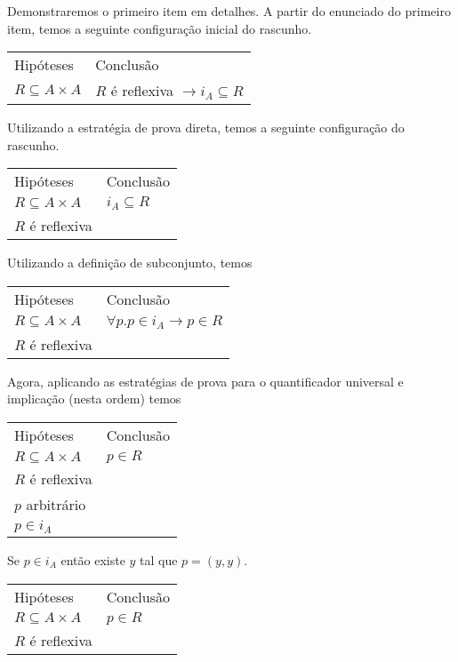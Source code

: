 \begin{Example}
Demonstraremos o primeiro item em detalhes.
A partir do enunciado do primeiro item, temos a seguinte configuração
inicial do rascunho.
\begin{flushleft}
\begin{tabular}{ll}
Hipóteses & Conclusão \\
$R\subseteq A \times A$ &  $R$ é reflexiva $\to i_{A}\subseteq R$
\end{tabular}
\end{flushleft}
Utilizando a estratégia de prova direta, temos a seguinte configuração
do rascunho.
\begin{flushleft}
\begin{tabular}{ll}
Hipóteses & Conclusão \\
$R\subseteq A \times A$ &  $i_{A}\subseteq R$\\
$R$ é reflexiva & \\
\end{tabular}
\end{flushleft}
Utilizando a definição de subconjunto, temos
\begin{flushleft}
\begin{tabular}{ll}
Hipóteses & Conclusão \\
$R\subseteq A \times A$ &  $\forall p. p \in i_{A} \to p \in  R$\\
$R$ é reflexiva & \\
\end{tabular}
\end{flushleft}
Agora, aplicando as estratégias de prova para o quantificador
universal e implicação (nesta ordem) temos
\begin{flushleft}
\begin{tabular}{ll}
Hipóteses & Conclusão \\
$R\subseteq A \times A$ &  $p \in  R$\\
$R$ é reflexiva & \\
$p$ arbitrário & \\
$p \in i_{A}$ & \\
\end{tabular}
\end{flushleft}
Se $p \in i_{A}$ então existe $y$ tal que $p = (y,y)$.
\begin{flushleft}
\begin{tabular}{ll}
Hipóteses & Conclusão \\
$R\subseteq A \times A$ &  $p \in  R$\\
$R$ é reflexiva & \\

\end{tabular}
\end{flushleft}
\end{Example}
